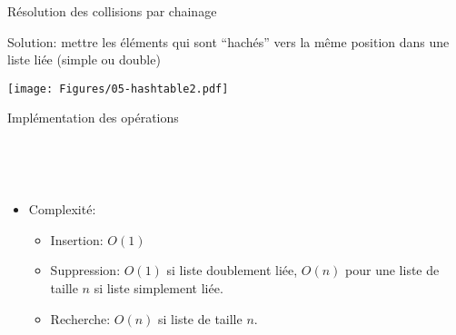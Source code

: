 \begin{frame}{Résolution des collisions par chainage}

Solution: mettre les éléments qui sont ``hachés'' vers la même
position dans une liste liée (simple ou double)

\bigskip

\centerline{\texttt{[image: Figures/05-hashtable2.pdf]}}

\end{frame}

\begin{frame}{Implémentation des opérations}

~\bigskip

\begin{center}
\begin{small}
~~~~~~~~

\bigskip

\end{small}
\end{center}

\bigskip
\bigskip

\begin{itemize}
\item Complexité:
\begin{itemize}
\item Insertion: $O(1)$
\item Suppression: $O(1)$ si liste doublement liée, $O(n)$ pour une liste de taille $n$ si liste simplement liée.
\item Recherche: $O(n)$ si liste de taille $n$.
\end{itemize}
\end{itemize}

\end{frame}

